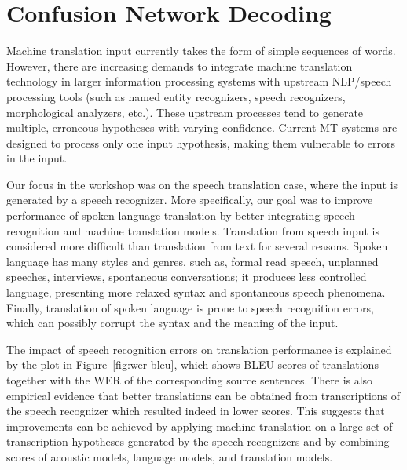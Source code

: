 \documentclass[10pt]{report}
\theoremstyle{plain}
\begin{document}
\chapter{Confusion Network Decoding}

\def\x{{\mathbf x}}
\def\L{{\cal L}}
\newcommand{\devfour}{{\tt dev4}}
\newcommand{\eval}{{\tt eval}}
\newcommand{\E}{{\bf e}}
\newcommand{\F}{{\bf f}}
\newcommand{\bm}[1]{{\mbox{\boldmath${#1}$}}}
\newcommand{\tf}{\tilde{f}}
\newcommand{\te}{\tilde{e}}
\newcommand{\teb}{{\bf \te}}


Machine translation input currently takes the form of simple sequences of words. 
However, there are increasing demands to integrate machine translation technology 
in larger information processing systems with upstream NLP/speech processing tools 
(such as named entity  recognizers, speech recognizers, morphological analyzers, etc.). 
These upstream processes tend to generate multiple, erroneous hypotheses with 
varying confidence.  Current MT systems are designed to process only one input 
hypothesis, making them vulnerable to errors in the input.  

\noindent
Our  focus in the workshop was on the speech translation case, where the input is 
generated by a speech recognizer.  More specifically, our goal was  to improve performance 
of spoken language translation by better integrating  speech recognition and 
machine translation  models. Translation from speech input is considered  more difficult than 
translation from text for several reasons. Spoken language has many  styles and 
genres, such as, formal read speech, unplanned speeches, interviews, spontaneous 
conversations;  it produces less controlled language, presenting more relaxed syntax 
and spontaneous speech phenomena. Finally, translation of spoken language is prone 
to speech recognition  errors, which can  possibly corrupt the  syntax and the meaning of 
the input.

The impact of speech recognition errors on translation performance
is explained by the plot in Figure~\ref{fig:wer-bleu}, which shows BLEU scores of 
translations together with the WER of the corresponding source sentences.  There is
also empirical evidence that better translations can be obtained from 
transcriptions of the speech recognizer which resulted indeed in lower scores.  This
suggests that improvements can be achieved by applying machine translation on 
a large set of transcription hypotheses generated by the speech recognizers and by
combining scores of  acoustic models, language models, and translation models.
\end{document}
